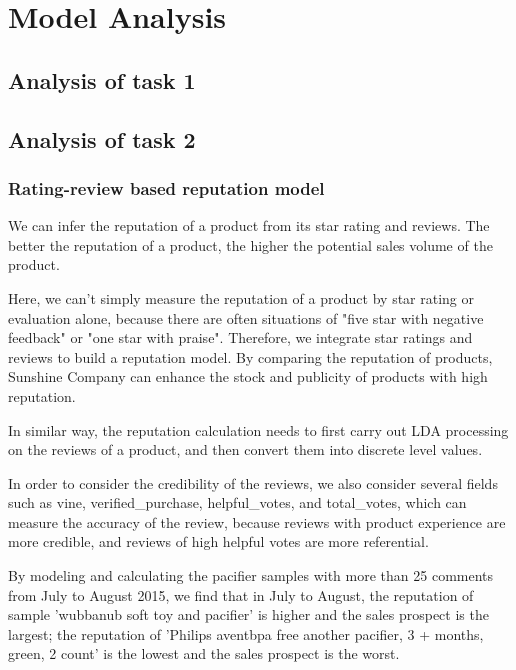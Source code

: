 \documentclass{mcmthesis}
\begin{document}

\section{Model Analysis}
\subsection{Analysis of task 1}
\subsection{Analysis of task 2}
\subsubsection{Rating-review based reputation model}
\indent We can infer the reputation of a product from its star rating and reviews. The better the reputation of a product, the higher the potential sales volume of the product. 

Here, we can't simply measure the reputation of a product by star rating or evaluation alone, because there are often situations of "five star with negative feedback" or "one star with praise". Therefore, we integrate star ratings and reviews to build a reputation model. By comparing the reputation of products, Sunshine Company can enhance the stock and publicity of products with high reputation.

In similar way, the reputation calculation needs to first carry out LDA processing on the reviews of a product, and then convert them into discrete level values. 

In order to consider the credibility of the reviews, we also consider several fields such as vine, verified\_purchase, helpful\_votes, and total\_votes, which can measure the accuracy of the review, because reviews with product experience are more credible, and reviews of high helpful votes are more referential.

By modeling and calculating the pacifier samples with more than 25 comments from July to August 2015, we find that in July to August, the reputation of sample 'wubbanub soft toy and pacifier' is higher and the sales prospect is the largest; the reputation of 'Philips aventbpa free another pacifier, 3 + months, green, 2 count' is the lowest and the sales prospect is the worst.
\end{document}
